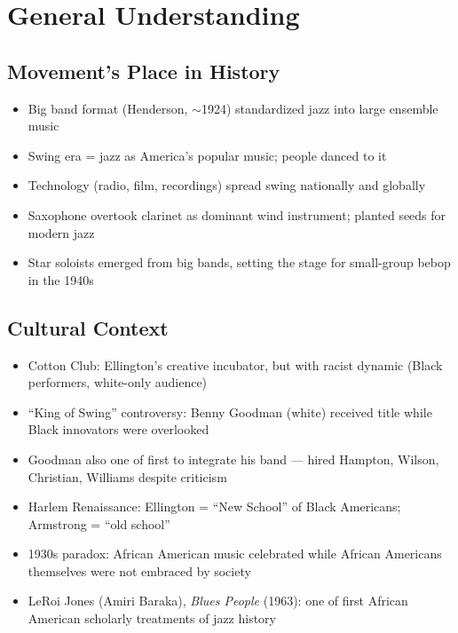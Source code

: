\documentclass[11pt, letterpaper]{article}
\begin{document}
\noindent{}

\section{General Understanding}

\subsection{Movement's Place in History}
\begin{itemize}
    \item Big band format (Henderson, $\sim$1924) standardized jazz into large ensemble music
    \item Swing era = jazz as America's popular music; people danced to it
    \item Technology (radio, film, recordings) spread swing nationally and globally
    \item Saxophone overtook clarinet as dominant wind instrument; planted seeds for modern jazz
    \item Star soloists emerged from big bands, setting the stage for small-group bebop in the 1940s
\end{itemize}

\subsection{Cultural Context}
\begin{itemize}
    \item Cotton Club: Ellington's creative incubator, but with racist dynamic (Black performers, white-only audience)
    \item ``King of Swing'' controversy: Benny Goodman (white) received title while Black innovators were overlooked
    \item Goodman also one of first to integrate his band --- hired Hampton, Wilson, Christian, Williams despite criticism
    \item Harlem Renaissance: Ellington = ``New School'' of Black Americans; Armstrong = ``old school''
    \item 1930s paradox: African American music celebrated while African Americans themselves were not embraced by society
    \item LeRoi Jones (Amiri Baraka), \textit{Blues People} (1963): one of first African American scholarly treatments of jazz history
\end{itemize}
\end{document}
